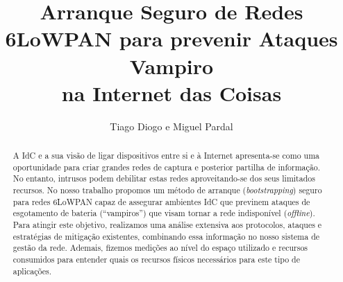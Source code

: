 \documentclass{llncs}
\begin{document}
\title{Arranque Seguro de Redes 6LoWPAN para prevenir Ataques Vampiro\\ na Internet das Coisas}
%
%
\author{Tiago Diogo e Miguel Pardal}
%
%
%

\maketitle              %

\begin{abstract}
A \ac{IdC} e a sua visão de ligar dispositivos entre si e à Internet apresenta-se como uma oportunidade para criar grandes redes de captura e posterior partilha de informação. 
No entanto, intrusos podem debilitar estas redes aproveitando-se dos seus limitados recursos. 
No nosso trabalho propomos um método de arranque (\textit{bootstrapping}) seguro para redes 6LoWPAN capaz de assegurar ambientes  \ac{IdC} que previnem ataques de esgotamento de bateria (``vampiros'') que visam tornar a rede indisponível (\textit{offline}). 
Para atingir este objetivo, realizamos uma análise extensiva aos protocolos, ataques e estratégias de mitigação existentes, combinando essa informação no nosso sistema de gestão da rede. 
Ademais, fizemos medições ao nível do espaço utilizado e recursos consumidos para entender quais os recursos físicos necessários para este tipo de aplicações.
\end{abstract}
\end{document}
